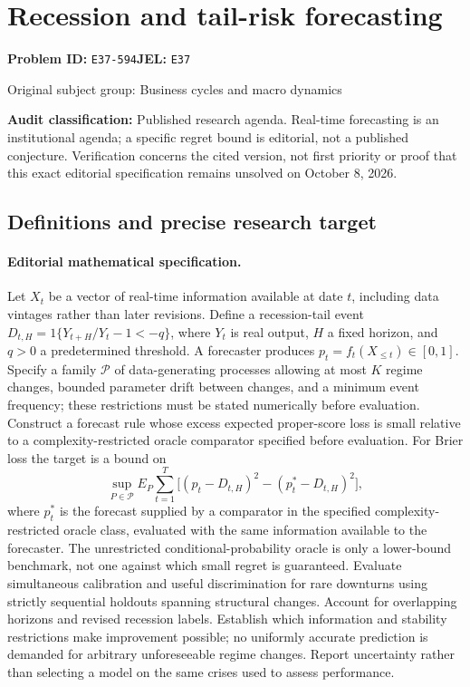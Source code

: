 \documentclass[11pt,a4paper]{article}
\begin{document}
\section*{Recession and tail-risk forecasting}
\textbf{Problem ID:} \texttt{E37-594}\quad \textbf{JEL:} \texttt{E37}\par
\label{problem:OP-0239}
{\sffamily\small\color{muted}Original subject group: Business cycles and macro dynamics\par}
\label{definitions:problem:30007520}
\textbf{Audit classification:} Published research agenda. Real-time forecasting is an institutional agenda; a specific regret bound is editorial, not a published conjecture. Verification concerns the cited version, not first priority or proof that this exact editorial specification remains unsolved on October 8, 2026.
\subsection*{Definitions and precise research target}
\paragraph{Editorial mathematical specification.} Let \(X_t\) be a vector of real-time information available at date \(t\), including data vintages rather than later revisions. Define a recession-tail event \(D_{t,H}=1\{Y_{t+H}/Y_t-1<-q\}\), where \(Y_t\) is real output, \(H\) a fixed horizon, and \(q>0\) a predetermined threshold. A forecaster produces \(p_t=f_t(X_{\le t})\in[0,1]\). Specify a family \(\mathcal P\) of data-generating processes allowing at most \(K\) regime changes, bounded parameter drift between changes, and a minimum event frequency; these restrictions must be stated numerically before evaluation.
Construct a forecast rule whose excess expected proper-score loss is small relative to a complexity-restricted oracle comparator specified before evaluation. For Brier loss the target is a bound on
\[
\sup_{P\in\mathcal P}E_P\sum_{t=1}^T
\big[(p_t-D_{t,H})^2-(p_t^*-D_{t,H})^2\big],
\]
where \(p_t^*\) is the forecast supplied by a comparator in the specified complexity-restricted oracle class, evaluated with the same information available to the forecaster. The unrestricted conditional-probability oracle is only a lower-bound benchmark, not one against which small regret is guaranteed.
Evaluate simultaneous calibration and useful discrimination for rare downturns using strictly sequential holdouts spanning structural changes. Account for overlapping horizons and revised recession labels. Establish which information and stability restrictions make improvement possible; no uniformly accurate prediction is demanded for arbitrary unforeseeable regime changes. Report uncertainty rather than selecting a model on the same crises used to assess performance.
\end{document}
